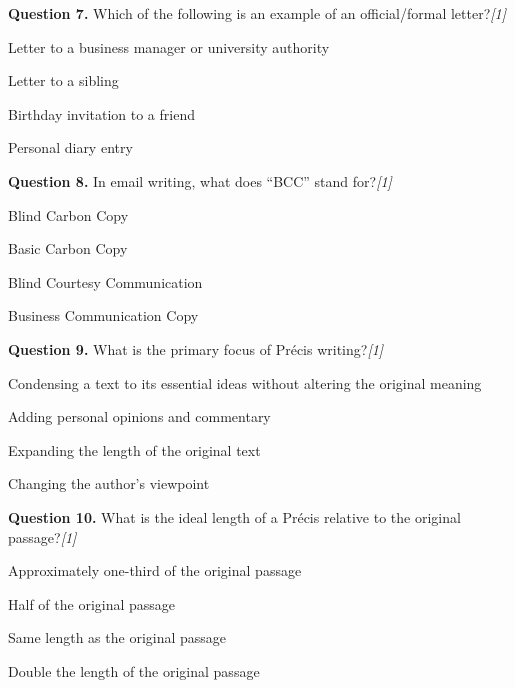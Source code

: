 \documentclass[11pt,a4paper]{article}
\newcommand{\pts}[1]{\hfill   \textit{[#1]}}
\begin{document}
\medskip




\noindent   \textbf{Question 7.} Which of the following is an example of an official/formal letter?\pts{1}

\begin{parts}
  \item Letter to a business manager or university authority
  \item Letter to a sibling
  \item Birthday invitation to a friend
  \item Personal diary entry
\end{parts}

\medskip




\noindent   \textbf{Question 8.} In email writing, what does ``BCC'' stand for?\pts{1}

\begin{parts}
  \item Blind Carbon Copy
  \item Basic Carbon Copy
  \item Blind Courtesy Communication
  \item Business Communication Copy
\end{parts}

\medskip




\noindent   \textbf{Question 9.} What is the primary focus of Précis writing?\pts{1}

\begin{parts}
  \item Condensing a text to its essential ideas without altering the original meaning
  \item Adding personal opinions and commentary
  \item Expanding the length of the original text
  \item Changing the author's viewpoint
\end{parts}

\medskip




\noindent   \textbf{Question 10.} What is the ideal length of a Précis relative to the original passage?\pts{1}

\begin{parts}
  \item Approximately one-third of the original passage
  \item Half of the original passage
  \item Same length as the original passage
  \item Double the length of the original passage
\end{parts}
\end{document}
